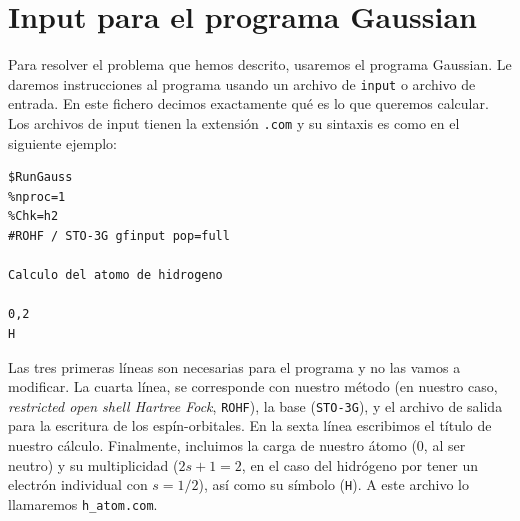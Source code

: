 \documentclass{tufte-book}
\begin{document}
\section{Input para el programa Gaussian}
Para resolver el problema que hemos descrito, usaremos
el programa Gaussian. Le daremos instrucciones al programa
usando un archivo de \texttt{input} o archivo de entrada.
En este fichero decimos exactamente qué es lo que queremos
calcular. Los archivos de input tienen la extensión 
\texttt{.com} y su sintaxis es como en el siguiente ejemplo:

\begin{verbatim}
$RunGauss
%nproc=1
%Chk=h2
#ROHF / STO-3G gfinput pop=full

Calculo del atomo de hidrogeno 
 
0,2
H
\end{verbatim}

Las tres primeras líneas son necesarias para el programa y 
no las vamos a modificar. La cuarta línea, se corresponde 
con nuestro método (en nuestro caso, \textit{restricted open 
shell Hartree Fock}, \texttt{ROHF}), la base (\texttt{STO-3G}),
y el archivo de salida para la escritura de los espín-orbitales.
En la sexta línea escribimos el título de nuestro cálculo.
Finalmente, incluimos la carga de nuestro átomo (0, al ser 
neutro) y su multiplicidad ($2s+1=2$, en el caso del hidrógeno
por tener un electrón individual con $s=1/2$), así como su símbolo
(\texttt{H}). A este archivo lo llamaremos \texttt{h\_atom.com}.
\end{document}
